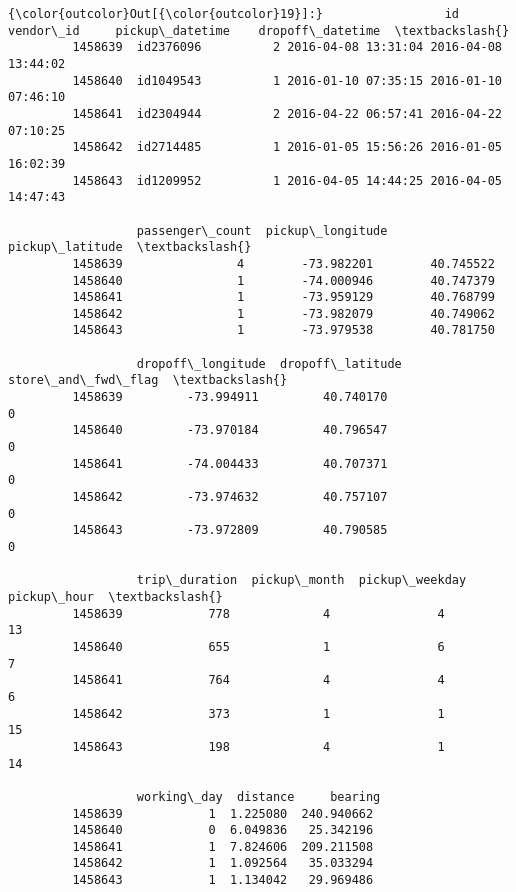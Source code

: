 \documentclass[11pt]{article}
\begin{document}
\begin{Verbatim}[commandchars=\\\{\}]
{\color{outcolor}Out[{\color{outcolor}19}]:}                 id  vendor\_id     pickup\_datetime    dropoff\_datetime  \textbackslash{}
         1458639  id2376096          2 2016-04-08 13:31:04 2016-04-08 13:44:02   
         1458640  id1049543          1 2016-01-10 07:35:15 2016-01-10 07:46:10   
         1458641  id2304944          2 2016-04-22 06:57:41 2016-04-22 07:10:25   
         1458642  id2714485          1 2016-01-05 15:56:26 2016-01-05 16:02:39   
         1458643  id1209952          1 2016-04-05 14:44:25 2016-04-05 14:47:43   
         
                  passenger\_count  pickup\_longitude  pickup\_latitude  \textbackslash{}
         1458639                4        -73.982201        40.745522   
         1458640                1        -74.000946        40.747379   
         1458641                1        -73.959129        40.768799   
         1458642                1        -73.982079        40.749062   
         1458643                1        -73.979538        40.781750   
         
                  dropoff\_longitude  dropoff\_latitude  store\_and\_fwd\_flag  \textbackslash{}
         1458639         -73.994911         40.740170                   0   
         1458640         -73.970184         40.796547                   0   
         1458641         -74.004433         40.707371                   0   
         1458642         -73.974632         40.757107                   0   
         1458643         -73.972809         40.790585                   0   
         
                  trip\_duration  pickup\_month  pickup\_weekday  pickup\_hour  \textbackslash{}
         1458639            778             4               4           13   
         1458640            655             1               6            7   
         1458641            764             4               4            6   
         1458642            373             1               1           15   
         1458643            198             4               1           14   
         
                  working\_day  distance     bearing  
         1458639            1  1.225080  240.940662  
         1458640            0  6.049836   25.342196  
         1458641            1  7.824606  209.211508  
         1458642            1  1.092564   35.033294  
         1458643            1  1.134042   29.969486  
\end{Verbatim}
            
\end{document}
